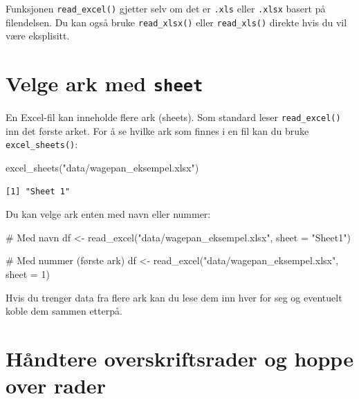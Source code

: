 \documentclass[
  norsk,
  letterpaper,
  DIV=11,
  numbers=noendperiod]{scrreprt}
\newenvironment{Shaded}{\begin{snugshade}}{\end{snugshade}}
\newcommand{\AttributeTok}[1]{\textcolor[rgb]{0.40,0.45,0.13}{#1}}
\newcommand{\CommentTok}[1]{\textcolor[rgb]{0.37,0.37,0.37}{#1}}
\newcommand{\DecValTok}[1]{\textcolor[rgb]{0.68,0.00,0.00}{#1}}
\newcommand{\FunctionTok}[1]{\textcolor[rgb]{0.28,0.35,0.67}{#1}}
\newcommand{\NormalTok}[1]{\textcolor[rgb]{0.00,0.23,0.31}{#1}}
\newcommand{\OtherTok}[1]{\textcolor[rgb]{0.00,0.23,0.31}{#1}}
\newcommand{\StringTok}[1]{\textcolor[rgb]{0.13,0.47,0.30}{#1}}
\theoremstyle{definition}
\theoremstyle{remark}
\begin{document}
Funksjonen \texttt{read\_excel()} gjetter selv om det er \texttt{.xls}
eller \texttt{.xlsx} basert på filendelsen. Du kan også bruke
\texttt{read\_xlsx()} eller \texttt{read\_xls()} direkte hvis du vil
være eksplisitt.

\section{\texorpdfstring{Velge ark med
\texttt{sheet}}{Velge ark med sheet}}\label{velge-ark-med-sheet}

En Excel-fil kan inneholde flere ark (sheets). Som standard leser
\texttt{read\_excel()} inn det første arket. For å se hvilke ark som
finnes i en fil kan du bruke \texttt{excel\_sheets()}:

\begin{Shaded}
\begin{Highlighting}[]
\FunctionTok{excel\_sheets}\NormalTok{(}\StringTok{"data/wagepan\_eksempel.xlsx"}\NormalTok{)}
\end{Highlighting}
\end{Shaded}

\begin{verbatim}
[1] "Sheet 1"
\end{verbatim}

Du kan velge ark enten med navn eller nummer:

\begin{Shaded}
\begin{Highlighting}[]
\CommentTok{\# Med navn}
\NormalTok{df }\OtherTok{\textless{}{-}} \FunctionTok{read\_excel}\NormalTok{(}\StringTok{"data/wagepan\_eksempel.xlsx"}\NormalTok{, }\AttributeTok{sheet =} \StringTok{"Sheet1"}\NormalTok{)}

\CommentTok{\# Med nummer (første ark)}
\NormalTok{df }\OtherTok{\textless{}{-}} \FunctionTok{read\_excel}\NormalTok{(}\StringTok{"data/wagepan\_eksempel.xlsx"}\NormalTok{, }\AttributeTok{sheet =} \DecValTok{1}\NormalTok{)}
\end{Highlighting}
\end{Shaded}

Hvis du trenger data fra flere ark kan du lese dem inn hver for seg og
eventuelt koble dem sammen etterpå.

\section{Håndtere overskriftsrader og hoppe over
rader}\label{huxe5ndtere-overskriftsrader-og-hoppe-over-rader}
\end{document}
